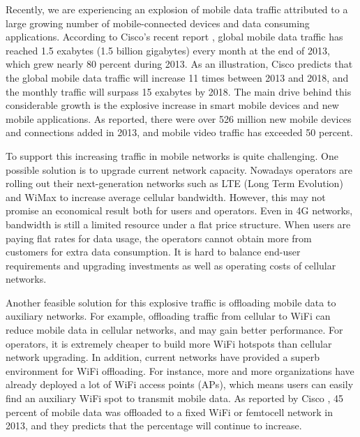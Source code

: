\documentclass[english]{tktltiki}
\begin{document}
Recently, we are experiencing an explosion of mobile data traffic attributed to a large growing number of mobile-connected devices and data consuming applications. According to Cisco's recent report \cite{cisco14}, global mobile data traffic has reached 1.5 exabytes (1.5 billion gigabytes) every month at the end of 2013, which grew nearly 80 percent during 2013. As an illustration, Cisco predicts that the global mobile data traffic will increase 11 times between 2013 and 2018, and the monthly traffic will surpass 15 exabytes by 2018. The main drive behind this considerable growth is the explosive increase in smart mobile devices and new mobile applications. As reported, there were over 526 million new mobile devices and connections added in 2013, and mobile video traffic has exceeded 50 percent.

To support this increasing traffic in mobile networks is quite challenging. One possible solution is to upgrade current network capacity. Nowadays operators are rolling out their next-generation networks such as LTE (Long Term Evolution) and WiMax to increase average cellular bandwidth. However, this may not promise an economical result both for users and operators. Even in 4G networks, bandwidth is still a limited resource under a flat price structure. When users are paying flat rates for data usage, the operators cannot obtain more from customers for extra data consumption. It is hard to balance end-user requirements and upgrading investments as well as operating costs of cellular networks.

Another feasible solution for this explosive traffic is offloading mobile data to auxiliary networks. For example, offloading traffic from cellular to WiFi can reduce mobile data in cellular networks, and may gain better performance. For operators, it is extremely cheaper to build more WiFi hotspots than cellular network upgrading. In addition, current networks have provided a superb environment for WiFi offloading. For instance, more and more organizations have already deployed a lot of WiFi access points (APs), which means users can easily find an auxiliary WiFi spot to transmit mobile data. As reported by Cisco \cite{cisco14}, 45 percent of mobile data was offloaded to a fixed WiFi or femtocell network in 2013, and they predicts that the percentage will continue to increase. 
\end{document}
